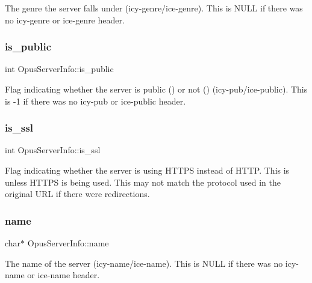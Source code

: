 The genre the server falls under (icy-\/genre/ice-\/genre). This is {\ttfamily N\+U\+LL} if there was no {\ttfamily icy-\/genre} or {\ttfamily ice-\/genre} header. \mbox{\label{struct_opus_server_info_a9e81d2992f3009847c30bb4b0dc5c7de}} 
\subsubsection{\texorpdfstring{is\+\_\+public}{is\_public}}
{\footnotesize\ttfamily int Opus\+Server\+Info\+::is\+\_\+public}

Flag indicating whether the server is public ({}) or not ({}) (icy-\/pub/ice-\/public). This is {\ttfamily -\/1} if there was no {\ttfamily icy-\/pub} or {\ttfamily ice-\/public} header. \mbox{\label{struct_opus_server_info_a3bce31c0a77548625a4d8125251e9b11}} 
\subsubsection{\texorpdfstring{is\+\_\+ssl}{is\_ssl}}
{\footnotesize\ttfamily int Opus\+Server\+Info\+::is\+\_\+ssl}

Flag indicating whether the server is using H\+T\+T\+PS instead of H\+T\+TP. This is {} unless H\+T\+T\+PS is being used. This may not match the protocol used in the original U\+RL if there were redirections. \mbox{\label{struct_opus_server_info_a6c1e013bd64991b75709ef1d76f962b6}} 
\subsubsection{\texorpdfstring{name}{name}}
{\footnotesize\ttfamily char$\ast$ Opus\+Server\+Info\+::name}

The name of the server (icy-\/name/ice-\/name). This is {\ttfamily N\+U\+LL} if there was no {\ttfamily icy-\/name} or {\ttfamily ice-\/name} header. \mbox{\label{struct_opus_server_info_a7aa583abd214ca9cefab6c1c99097202}} 
